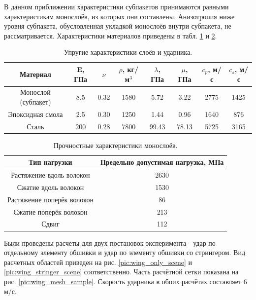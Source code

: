 В данном приближении характеристики субпакетов принимаются равными характеристикам монослоёв, из которых они составлены. 
Анизотропия ниже уровня субпакета, обусловленная укладкой монослоёв внутри субпакета, не рассматривается. Характеристики материалов приведены в табл. \ref{tbl:subpackage} и \ref{tbl:max_stresses}.

\begin{table}
\centering
\begin{tabular}{|c|c|c|c|c|c|c|c|}
\hline
Материал & E, ГПа & $\nu$ & $\rho$, кг/м$^{3}$ & $\lambda$, ГПа & $\mu$, ГПа &
$c_p$, м/с & $c_s$, м/с \\
\hline
Монослой (субпакет) & 8.5 & 0.32 & 1580 & 5.72 & 3.22 & 2775 & 1425 \\
Эпоксидная смола & 2.5 & 0.30 & 1250 & 1.44 & 0.96 & 1640 & 876 \\
Сталь & 200 & 0.28 & 7800 & 99.43 & 78.13 & 5725 & 3165 \\
\hline
\end{tabular}
\caption{Упругие характеристики слоёв и ударника.}
\label{tbl:subpackage}
\end{table}

\begin{table}
\centering
\begin{tabular}{|c|c|}
\hline
Тип нагрузки & Предельно допустимая нагрузка, МПа \\
\hline
Растяжение вдоль волокон & 2630 \\
Сжатие вдоль волокон & 1530 \\
Растяжение поперёк волокон & 86 \\
Сжатие поперёк волокон & 213 \\
Сдвиг & 112 \\
\hline
\end{tabular}
\caption{Прочностные характеристики монослоёв.}
\label{tbl:max_stresses}
\end{table}


Были проведены расчеты для двух постановок эксперимента - удар по отдельному элементу обшивки и удар по элементу обшивки со стрингером. Вид расчетных областей приведен на рис. \ref{pic:wing_only_scene} и \ref{pic:wing_stringer_scene} соответственно. Часть расчётной сетки показана на рис. \ref{pic:wing_mesh_sample}. Скорость ударника в обоих расчётах составляет 6 м/с.

